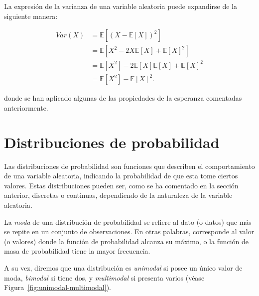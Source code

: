 \begin{observacion}
    La expresión de la varianza de una variable aleatoria puede expandirse de la siguiente manera:

    \begin{align*}
        Var(X) &= \mathbb{E}[{(X - \mathbb{E}[X])}^2] \\
        &= \mathbb{E}[X^2 - 2X\mathbb{E}[X] + \mathbb{E}{[X]}^2] \\
        &=  \mathbb{E}[X^2] - 2\mathbb{E}[X]\mathbb{E}[X] + \mathbb{E}{[X]}^2 \\
        &= \mathbb{E}[X^2]  - \mathbb{E}{[X]}^2.
    \end{align*}

    donde se han aplicado algunas de las propiedades de la esperanza comentadas anteriormente.
\end{observacion}

\section{Distribuciones de probabilidad}

Las distribuciones de probabilidad son funciones que describen el comportamiento de una variable aleatoria, indicando la probabilidad de que esta tome ciertos valores. Estas distribuciones pueden ser, como se ha comentado en la sección anterior, discretas o continuas, dependiendo de la naturaleza de la variable aleatoria.

\begin{definicion}[Moda]
    La \textit{moda} de una distribución de probabilidad se refiere al dato (o datos) que más se repite en un conjunto de observaciones. En otras palabras, corresponde al valor (o valores) donde la función de probabilidad alcanza su máximo, o la función de masa de probabilidad tiene la mayor frecuencia.
\end{definicion}

A su vez, diremos que una distribución es \textit{unimodal} si posee un único valor de moda, \textit{bimodal} si tiene dos, y \textit{multimodal} si presenta varios (véase Figura~\ref{fig:unimodal-multimodal}).

